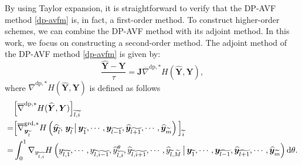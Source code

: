 \documentclass[fleqn,11pt]{elsarticle}
\numberwithin{equation}{section}
\begin{document}
By using Taylor expansion, it is straightforward to verify that the DP-AVF method \eqref{dp-avfm} is, in fact, a first-order method. To construct higher-order schemes, we can combine the DP-AVF method with its adjoint method. In this work, we focus on constructing a second-order method. The adjoint method of the DP-AVF method \eqref{dp-avfm} is given by:
\begin{equation}\label{dp-avfm-adj}
	\frac{\widehat{\bm Y}-\bm Y}{\tau}=\bm J\overline{\nabla}^{\text{dp},*}H(\widehat{\bm Y},\bm Y),
\end{equation}
where $\overline{\nabla}^{\text{dp},*}H(\widehat{\bm Y},\bm Y)$ is defined as follows
\begin{equation*}
	\begin{aligned}
		  & \Big[\overline{\nabla}^{\text{dp},*}H(\widehat{\bm Y},\bm Y)\Big]_{\widetilde{l},\widetilde{i}}                                                                                                                                                                                                                                                                                                                                                      \\
		= & \Big[\overline{\nabla}^{\text{grd},*}_{\bm{y}_{\widetilde{l}}} H\left(\widehat{\bm{y}_{\widetilde{l}}},\, \bm{y}_{\widetilde{l}}\,\big|\,{\bm{y}}_{\widetilde{1}}, \cdots, {\bm{y}}_{\widetilde{l-1}},  \widehat{\bm{y}}_{\widetilde{l+1}}, \cdots, \widehat{\bm{y}}_{\widetilde{m}}\right)\Big]_{\widetilde{i}}                                                                                                                                         \\
		= & \int_0^1\nabla_{y_{\widetilde{l},\widetilde{i}}} H\left({y}_{\widetilde{l},\widetilde{1}},\cdots,{y}_{\widetilde{l},\widetilde{i-1}}, \widehat{y}_{\widetilde{l},\widetilde{i}}^\theta, \widehat{y}_{\widetilde{l},\widetilde{i+1}},\cdots, \widehat{y}_{\widetilde{l},\widetilde{M}}\,\big|\,{\bm y}_{\widetilde{1}}, \cdots, {\bm y}_{\widetilde{l-1}}, \widehat{\bm y}_{\widetilde{l+1}},\cdots, \widehat{\bm y}_{\widetilde{m}}\right){\rm d}\theta.
	\end{aligned}
\end{equation*}
\end{document}
